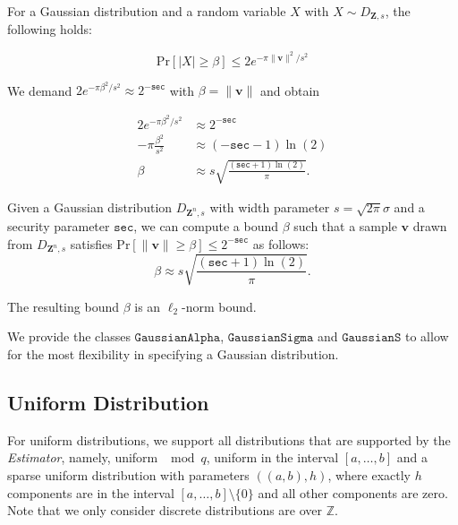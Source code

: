 For a Gaussian distribution and a random variable $X$ with $X \sim D_{\mathbf{Z}, s}$, the following holds: %

\begin{equation}
    \text{Pr}\left[ |X| \geq \beta \right] \leq 2 e^{-\pi \|\mathbf{v}\|^2/s^2}
\end{equation}

We demand $2 e^{-\pi \beta^2/s^2} \approx 2^{-\texttt{sec}}$ with $\beta = \|\mathbf{v}\|$  and obtain

\begin{align*}
    2 e^{-\pi \beta^2/s^2}   & \approx 2^{-\texttt{sec}}                               \\
    -\pi \frac{\beta^2}{s^2} & \approx (-\texttt{sec} - 1)\ln (2)                      \\
    \beta                    & \approx s \sqrt{\frac{(\texttt{sec} + 1) \ln(2)}{\pi}}.
\end{align*}

\begin{theorem}
    Given a Gaussian distribution $D_{\mathbf{Z}^n, s}$ with width parameter $s  = \sqrt{2 \pi} \sigma$ and a security parameter $\texttt{sec}$, we can compute a bound $\beta$ such that a sample $\mathbf{v}$ drawn from $D_{\mathbf{Z}^n, s}$ satisfies $\text{Pr}\left[ \|\mathbf{v}\| \geq \beta \right] \leq 2^{-\texttt{sec}}$ as follows:
    \begin{equation}
        \beta  \approx s \sqrt{\frac{(\texttt{sec} + 1) \ln(2)}{\pi}}.
    \end{equation}
\end{theorem}

The resulting bound $\beta$ is an $\ell_2$-norm bound. %

We provide the classes $\texttt{GaussianAlpha}$, $\texttt{GaussianSigma}$ and $\texttt{GaussianS}$ to allow for the most flexibility in specifying a Gaussian distribution.

\subsection{Uniform Distribution}
For uniform distributions, we support all distributions that are supported by the \textit{Estimator}, namely, uniform $\mod q$, uniform in the interval $[a,\dots,b]$ and a sparse uniform distribution with parameters $((a,b), h)$, where exactly $h$ components are in the interval $[a,\dots,b] \setminus \{0\}$ and all other components are zero. Note that we only consider discrete distributions are over $\mathbb{Z}$.

